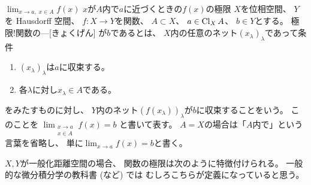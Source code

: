 \documentclass[report]{jlreq}
\begin{document}
\begin{definition}[関数の極限]
        {$\lim_{x \to a, \; x \in A} f(x)$}
        {$x$が$A$内で$a$に近づくときの$f(x)$の極限}
    $X$を位相空間、
    $Y$を Hausdorff 空間、
    $f \colon X \to Y$を関数、
    $A \subset X$、
    $a \in \operatorname{Cl}_X A$、
    $b \in Y$とする。
        {極限!関数の---}[きょくげん]
    が$b$であるとは、
    $X$内の任意のネット$(x_\lambda)_\lambda$であって条件
    \begin{enumerate}
        \item $(x_\lambda)_\lambda$は$a$に収束する。
        \item 各$\lambda$に対し$x_\lambda \in A$である。
    \end{enumerate}
    をみたすものに対し、
    $Y$内のネット$(f(x_\lambda))_\lambda$が$b$に収束することをいう。
    このことを
    $\lim_{\substack{x \to a \\ x \in A}} f(x) = b$
    と書いて表す。
    $A = X$の場合は「$A$内で」という言葉を省略し、
    単に$\lim_{x \to a} f(x) = b$と書く。
\end{definition}

$X, Y$が一般化距離空間の場合、
関数の極限は次のように特徴付けられる。
一般的な微分積分学の教科書 (\cite{杉浦80}など) では
むしろこちらが定義になっていると思う。


\end{document}
